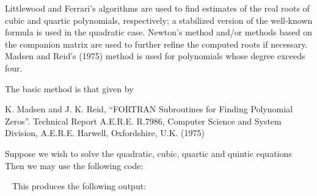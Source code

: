 \documentclass{galahad}
\begin{document}

\galmethod
Littlewood and Ferrari's algorithms are used to find estimates of the
real roots of cubic and quartic polynomials, respectively; a stabilized version 
of the well-known formula is used in the quadratic case. Newton's
method and/or methods based on the companion matrix are used to further 
refine the computed roots if necessary. Madsen and Reid's (1975) method 
is used for polynomials whose degree exceeds four.
\vspace*{1mm}

\galreferences
\vspace*{1mm}

\noindent
The basic method is that given by
\vspace*{1mm}

\noindent
K. Madsen and J. K. Reid, 
``FORTRAN Subroutines for Finding Polynomial Zeros''.
Technical Report A.E.R.E. R.7986, Computer Science and System Division, 
A.E.R.E. Harwell, Oxfordshire, U.K. (1975)


\galexample
Suppose we wish to solve the quadratic, cubic, quartic and quintic equations
Then we may use the following code:

{\tt \small
\VerbatimInput{\packageexample}
}
\noindent
This produces the following output:
{\tt \small
\VerbatimInput{\packageresults}
}
\end{document}
